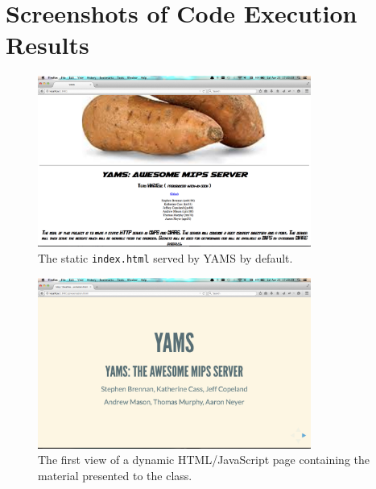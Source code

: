 \documentclass[journal,10pt]{IEEEtran}
\begin{document}
%


\onecolumn %
\section{Screenshots of Code Execution Results}

\begin{figure}[H]
\centering
\includegraphics[width=0.8\textwidth,natwidth=1440,natheight=900]{static_document}
\caption{The static \texttt{index.html} served by YAMS by default.}
\label{fig:static_document}
\end{figure}

\begin{figure}[H]
\centering
\includegraphics[width=0.8\textwidth,natwidth=1440,natheight=900]{dynamic_document}
\caption{The first view of a dynamic HTML/JavaScript page containing the material presented to the class.}
\label{fig:dynamic_document}
\end{figure}
\end{document}

